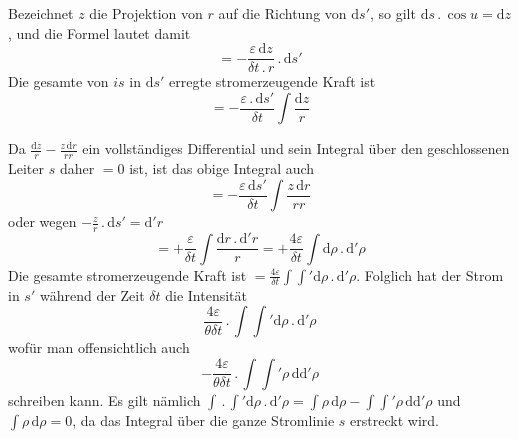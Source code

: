 Bezeichnet $z$ die Projektion von $r$ auf die Richtung von $\mathrm ds'$, so gilt $\mathrm ds\,.\,\cos u=\mathrm dz$, und die Formel lautet damit
\[
=-\frac{\varepsilon\,\mathrm dz}{\delta t\,.\,r}\,.\,\mathrm ds'
\]
Die gesamte von $is$ in $\mathrm ds'$ erregte stromerzeugende Kraft ist
\[
=-\frac{\varepsilon\,.\,\mathrm ds'}{\delta t}\int\frac{\mathrm dz}{r}
\]

Da $\frac{\mathrm dz}{r}-\frac{z\,\mathrm dr}{rr}$ ein vollständiges Differential und sein Integral über den geschlossenen Leiter $s$ daher $=0$ ist, ist das obige Integral auch
\[
=-\frac{\varepsilon\,\mathrm ds'}{\delta t}\int\frac{z\,\mathrm dr}{rr}
\]
oder wegen $-\frac{z}{r}\,.\,\mathrm ds'=\mathrm d'r$
\[
=+\frac{\varepsilon}{\delta t}\int\frac{\mathrm dr\,.\,\mathrm d'r}{r}=+\frac{4\varepsilon}{\delta t}\int\mathrm d\rho\,.\,\mathrm d'\rho
\]
Die gesamte stromerzeugende Kraft ist $=\frac{4\varepsilon}{\delta t}\int\int'\mathrm d\rho\,.\,\mathrm d'\rho$. Folglich hat der Strom in $s'$ während der Zeit $\delta t$ die Intensität
\[
\frac{4\varepsilon}{\theta\delta t}\,.\,\int\int'\mathrm d\rho\,.\,\mathrm d'\rho
\]
wofür man offensichtlich auch
\[
-\frac{4\varepsilon}{\theta\delta t}\,.\,\int\int'\rho\,\mathrm d\mathrm d'\rho
\]
schreiben kann. Es gilt nämlich $\int\,.\,\int'\mathrm d\rho\,.\,\mathrm d'\rho=\int\rho\,\mathrm d\rho-\int\int'\rho\,\mathrm d\mathrm d'\rho$ und $\int\rho\,\mathrm d\rho=0$, da das Integral über die ganze Stromlinie $s$ erstreckt wird.

